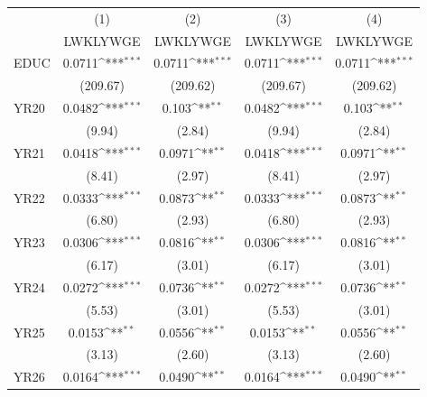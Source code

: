 {
\def\sym#1{\ifmmode^{#1}\else\(^{#1}\)\fi}
\begin{tabular}{l*{4}{c}}
\hline\hline
            &\multicolumn{1}{c}{(1)}&\multicolumn{1}{c}{(2)}&\multicolumn{1}{c}{(3)}&\multicolumn{1}{c}{(4)}\\
            &\multicolumn{1}{c}{LWKLYWGE}&\multicolumn{1}{c}{LWKLYWGE}&\multicolumn{1}{c}{LWKLYWGE}&\multicolumn{1}{c}{LWKLYWGE}\\
\hline
EDUC        &      0.0711\sym{***}&      0.0711\sym{***}&      0.0711\sym{***}&      0.0711\sym{***}\\
            &    (209.67)         &    (209.62)         &    (209.67)         &    (209.62)         \\
[1em]
YR20        &      0.0482\sym{***}&       0.103\sym{**} &      0.0482\sym{***}&       0.103\sym{**} \\
            &      (9.94)         &      (2.84)         &      (9.94)         &      (2.84)         \\
[1em]
YR21        &      0.0418\sym{***}&      0.0971\sym{**} &      0.0418\sym{***}&      0.0971\sym{**} \\
            &      (8.41)         &      (2.97)         &      (8.41)         &      (2.97)         \\
[1em]
YR22        &      0.0333\sym{***}&      0.0873\sym{**} &      0.0333\sym{***}&      0.0873\sym{**} \\
            &      (6.80)         &      (2.93)         &      (6.80)         &      (2.93)         \\
[1em]
YR23        &      0.0306\sym{***}&      0.0816\sym{**} &      0.0306\sym{***}&      0.0816\sym{**} \\
            &      (6.17)         &      (3.01)         &      (6.17)         &      (3.01)         \\
[1em]
YR24        &      0.0272\sym{***}&      0.0736\sym{**} &      0.0272\sym{***}&      0.0736\sym{**} \\
            &      (5.53)         &      (3.01)         &      (5.53)         &      (3.01)         \\
[1em]
YR25        &      0.0153\sym{**} &      0.0556\sym{**} &      0.0153\sym{**} &      0.0556\sym{**} \\
            &      (3.13)         &      (2.60)         &      (3.13)         &      (2.60)         \\
[1em]
YR26        &      0.0164\sym{***}&      0.0490\sym{**} &      0.0164\sym{***}&      0.0490\sym{**} \\

\end{tabular}}
